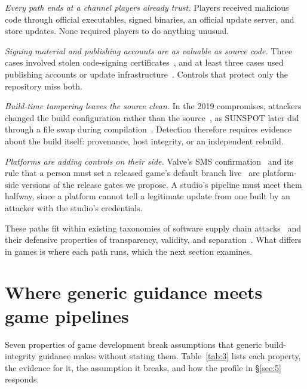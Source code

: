 \documentclass[acmsmall,screen,review]{acmart}
\begin{document}
\emph{Every path ends at a channel players already trust.} Players received malicious code through official executables, signed binaries, an official update server, and store updates. None required players to do anything unusual.

\emph{Signing material and publishing accounts are as valuable as source code.} Three cases involved stolen code-signing certificates~\cite{kaspersky2013winnti,mandiant2019apt41,eset2020winnti}, and at least three cases used publishing accounts or update infrastructure~\cite{kaspersky2013winnti,toulas2023steam,gatlan2023steam}. Controls that protect only the repository miss both.

\emph{Build-time tampering leaves the source clean.} In the 2019 compromises, attackers changed the build configuration rather than the source~\cite{eset2019gaming}, as SUNSPOT later did through a file swap during compilation~\cite{crowdstrike2021sunspot}. Detection therefore requires evidence about the build itself: provenance, host integrity, or an independent rebuild.

\emph{Platforms are adding controls on their side.} Valve's SMS confirmation~\cite{toulas2023steam} and its rule that a person must set a released game's default branch live~\cite{valvenduploading} are platform-side versions of the release gates we propose. A studio's pipeline must meet them halfway, since a platform cannot tell a legitimate update from one built by an attacker with the studio's credentials.

These paths fit within existing taxonomies of software supply chain attacks~\cite{ladisa2023sok} and their defensive properties of transparency, validity, and separation~\cite{okafor2022sok}. What differs in games is where each path runs, which the next section examines.


\section{Where generic guidance meets game pipelines}\label{sec:4}

Seven properties of game development break assumptions that generic build-integrity guidance makes without stating them. Table~\ref{tab:3} lists each property, the evidence for it, the assumption it breaks, and how the profile in \S\ref{sec:5} responds.
\end{document}
